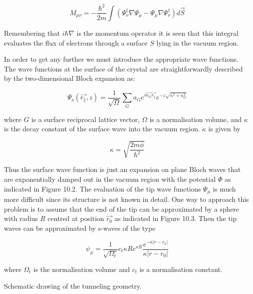 \begin{equation}
M_{\mu\nu}=-\frac{\hbar^2}{2m}\int(\Psi_{\nu}^{\dag}\nabla\Psi_{\mu}-\Psi_{\mu} \nabla\Psi_{\nu}^{\dag})d\vec{S}
\end{equation}

Remembering that $i\hbar\nabla$ is the momentum operator it is seen that this integral evaluates the flux of electrons through a surface $S$ lying in the vacuum region.

In order to get any further we must introduce the appropriate wave functions. The wave functions at the surface of the crystal are straightforwardly described by the two-dimensional Bloch expansion as:

\begin{equation}
\Psi_{\nu}(\vec{r_{\parallel}},z)=\frac{1}{\sqrt{\Omega}}\sum_Ga_Ge^{i\vec{\kappa_G}\vec{r_{\parallel}}}e^{-z\sqrt{\kappa^2+\kappa_G^2}}
\end{equation}

\noindent where $G$ is a surface reciprocal lattice vector, $\Omega$ is a normalisation volume, and $\kappa$ is the decay constant of the surface wave into the vacuum region. $\kappa$ is given by

\begin{equation}
\kappa=\sqrt{\frac{2m\phi}{\hbar^2}}
\end{equation}

Thus the surface wave function is just an expansion on plane Bloch waves that are exponentially damped out in the vacuum region with the potential $\Phi$ as indicated in Figure 10.2. The evaluation of the tip wave functions $\Psi_\mu$ is much more difficult since its structure is not known in detail. One way to approach this problem is to assume that the end of the tip can be approximated by a sphere with radius $R$ centred at position $\vec{r_0}$ as indicated in Figure 10.3. Then the tip waves can be approximated by s-waves of the type

\begin{equation}
\psi_{\mu}=\frac{1}{\sqrt{\Omega_t}}c_t \kappa Re^{\kappa R}\frac{e^{-\kappa\vert r-r_0\vert}}{\kappa\vert r-r_0\vert}
\end{equation}
 
\noindent where $\Omega_t$ is the normalisation volume and $c_t$ is a normalisation constant.

\vspace*{8cm}

 Schematic drawing of the tunneling geometry.

